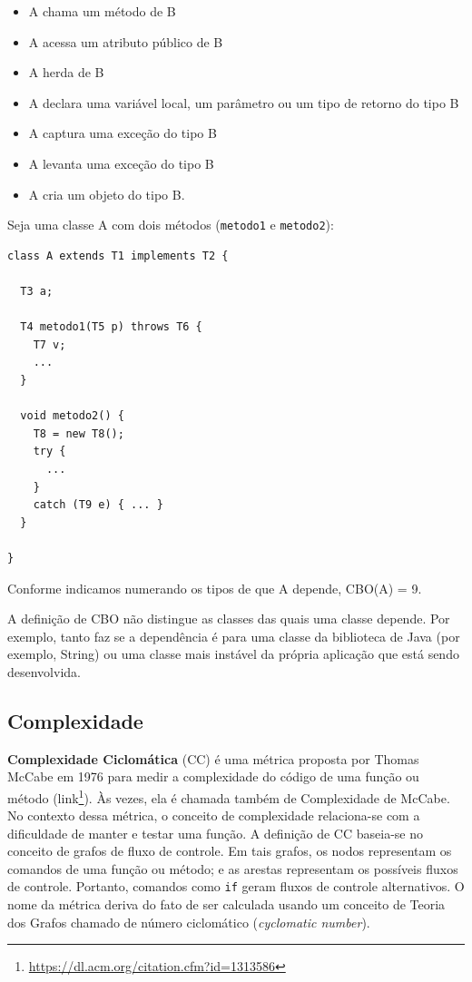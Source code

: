 \documentclass[
  11pt,
  twoside]{book}
\newcommand{\passthrough}[1]{#1}
\DeclareRobustCommand{\href}[2]{#2\footnote{\url{#1}}}
\begin{document}
\begin{itemize}
\item
  A chama um método de B
\item
  A acessa um atributo público de B
\item
  A herda de B
\item
  A declara uma variável local, um parâmetro ou um tipo de retorno do
  tipo B
\item
  A captura uma exceção do tipo B
\item
  A levanta uma exceção do tipo B
\item
  A cria um objeto do tipo B.
\end{itemize}

Seja uma classe A com dois métodos (\passthrough{\lstinline!metodo1!} e
\passthrough{\lstinline!metodo2!}):

\begin{lstlisting}
class A extends T1 implements T2 {

  T3 a;

  T4 metodo1(T5 p) throws T6 {
    T7 v;
    ...
  }

  void metodo2() {
    T8 = new T8();
    try {
      ...
    }
    catch (T9 e) { ... }
  }

}
\end{lstlisting}

Conforme indicamos numerando os tipos de que A depende, CBO(A) = 9.

A definição de CBO não distingue as classes das quais uma classe
depende. Por exemplo, tanto faz se a dependência é para uma classe da
biblioteca de Java (por exemplo, String) ou uma classe mais instável da
própria aplicação que está sendo desenvolvida.

\hypertarget{complexidade}{%
\subsection{Complexidade}\label{complexidade}}

 

\textbf{Complexidade Ciclomática} (CC) é uma métrica proposta por Thomas
McCabe em 1976 para medir a complexidade do código de uma função ou
método (\href{https://dl.acm.org/citation.cfm?id=1313586}{link}). Às
vezes, ela é chamada também de Complexidade de McCabe. No contexto dessa
métrica, o conceito de complexidade relaciona-se com a dificuldade de
manter e testar uma função. A definição de CC baseia-se no conceito de
grafos de fluxo de controle. Em tais grafos, os nodos representam os
comandos de uma função ou método; e as arestas representam os possíveis
fluxos de controle. Portanto, comandos como \passthrough{\lstinline!if!}
geram fluxos de controle alternativos. O nome da métrica deriva do fato
de ser calculada usando um conceito de Teoria dos Grafos chamado de
número ciclomático (\emph{cyclomatic number}).
\end{document}

